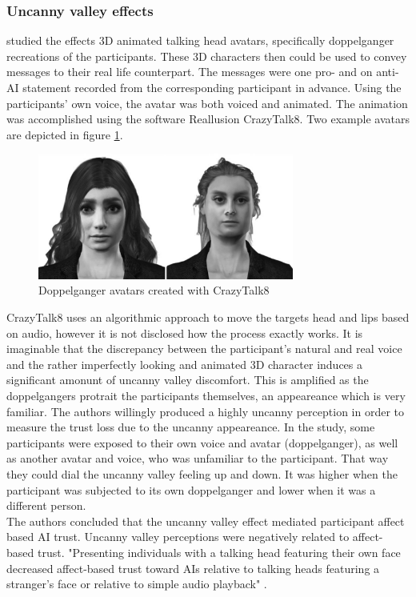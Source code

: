 \documentclass[
  a4paper,  %
  twoside,  %
  bibliography=totoc,
  headsepline,
  cleardoublepage=empty,
  parskip=half,
  draft=false
]{scrbook}
\begin{document}
\subsubsection*{Uncanny valley effects}
 studied the effects 3D animated talking head avatars, specifically doppelganger recreations of the participants. These 3D characters then could be used to convey messages to their real life counterpart. The messages were one pro- and on anti-AI statement recorded from the corresponding participant in advance. Using the participants' own voice, the avatar was both voiced and animated. The animation was accomplished using the software Reallusion CrazyTalk8. Two example avatars are depicted in figure \ref{fig:uncanny-avatars}.
\begin{figure}[h]
  \centering
  \includegraphics[width=0.75\textwidth]{./graphics/images/uncanny-avatars.png}
  \caption{Doppelganger avatars created with CrazyTalk8 \cite{weismanFaceUncannyEffects2021}}
  \label{fig:uncanny-avatars}
\end{figure}
CrazyTalk8 uses an algorithmic approach to move the targets head and lips based on audio, however it is not disclosed how the process exactly works. It is imaginable that the discrepancy between the participant's natural and real voice and the rather imperfectly looking and animated 3D character induces a significant amonunt of uncanny valley discomfort. This is amplified as the doppelgangers protrait the participants themselves, an appeareance which is very familiar. The authors willingly produced a highly uncanny perception in order to measure the trust loss due to the uncanny appeareance. In the study, some participants were exposed to their own voice and avatar (doppelganger), as well as another avatar and voice, who was unfamiliar to the participant. That way they could dial the uncanny valley feeling up and down. It was higher when the participant was subjected to its own doppelganger and lower when it was a different person.\\
The authors concluded that the uncanny valley effect mediated participant affect based AI trust. Uncanny valley perceptions were negatively related to affect-based trust. "Presenting individuals with a talking head featuring their own face decreased affect-based trust toward AIs relative to talking heads featuring a stranger's face or relative to simple audio playback" \cite{weismanFaceUncannyEffects2021}. \\
\end{document}
